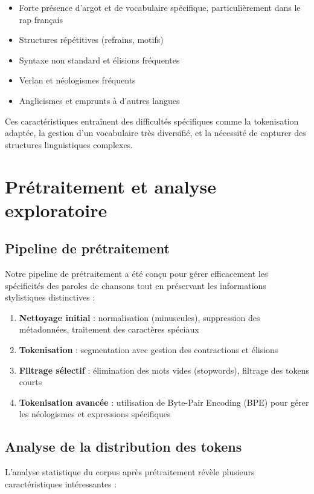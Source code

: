 \documentclass[a4paper,11pt]{article}
\begin{document}
\begin{itemize}
    \item Forte présence d'argot et de vocabulaire spécifique, particulièrement dans le rap français
    \item Structures répétitives (refrains, motifs)
    \item Syntaxe non standard et élisions fréquentes
    \item Verlan et néologismes fréquents
    \item Anglicismes et emprunts à d'autres langues
\end{itemize}

Ces caractéristiques entraînent des difficultés spécifiques comme la tokenisation adaptée, la gestion d'un vocabulaire très diversifié, et la nécessité de capturer des structures linguistiques complexes.

\section{Prétraitement et analyse exploratoire}
\label{sec:preprocessing}

\subsection{Pipeline de prétraitement}
Notre pipeline de prétraitement a été conçu pour gérer efficacement les spécificités des paroles de chansons tout en préservant les informations stylistiques distinctives :

\begin{enumerate}
    \item \textbf{Nettoyage initial} : normalisation (minuscules), suppression des métadonnées, traitement des caractères spéciaux
    \item \textbf{Tokenisation} : segmentation avec gestion des contractions et élisions
    \item \textbf{Filtrage sélectif} : élimination des mots vides (stopwords), filtrage des tokens courts
    \item \textbf{Tokenisation avancée} : utilisation de Byte-Pair Encoding (BPE) pour gérer les néologismes et expressions spécifiques
\end{enumerate}

\subsection{Analyse de la distribution des tokens}
L'analyse statistique du corpus après prétraitement révèle plusieurs caractéristiques intéressantes :
\end{document}
